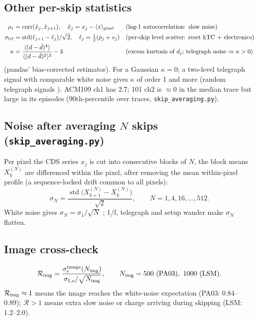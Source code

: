 \documentclass[10pt,a4paper]{article}
\newcommand{\code}[1]{\texttt{\small #1}}
\newcommand{\std}{\operatorname{std}}
\begin{document}
\subsection{Other per-skip statistics}
\begin{align}
\rho_1 &= \operatorname{corr}(\tilde x_j,\tilde x_{j+1}),\quad \tilde x_j = x_j-\langle x\rangle_{\text{pixel}}
&&\text{(lag-1 autocorrelation: slow noise)}\\
\sigma_{\rm lvl} &= \std(\ell_{j+1}-\ell_j)/\sqrt2,\quad \ell_j=\tfrac12(p_j+s_j)
&&\text{(per-skip level scatter: reset kTC + electronics)}\\
\kappa &= \frac{\langle (d-\bar d)^4\rangle}{\langle (d-\bar d)^2\rangle^2}-3
&&\text{(excess kurtosis of } d_j\text{; telegraph noise} \Rightarrow \kappa>0)
\end{align}
(pandas' bias-corrected estimator). For a Gaussian $\kappa=0$; a two-level telegraph signal with comparable white noise
gives $\kappa$ of order 1 and more (random telegraph signals \cite{kirton1989}). ACM109 ch1 has 2.7; 101 ch2 is $\approx0$ in the median trace but large in its
episodes (90th-percentile over traces, \code{skip\_averaging.py}).

\subsection{Noise after averaging $N$ skips (\code{skip\_averaging.py})}
Per pixel the CDS series $x_j$ is cut into consecutive blocks of $N$, the block means $X_k^{(N)}$ are differenced
within the pixel, after removing the mean within-pixel profile (a sequence-locked drift common to all pixels):
\begin{equation}
\sigma_N=\frac{\std\big(X^{(N)}_{k+1}-X^{(N)}_k\big)}{\sqrt2}, \qquad N=1,4,16,\dots,512.
\end{equation}
White noise gives $\sigma_N=\sigma_1/\sqrt N$ \cite{tiffenberg2017}; 1/f, telegraph and setup wander make $\sigma_N$ flatten.

\subsection{Image cross-check}
\begin{equation}
\mathcal R_{\rm img}=\frac{\sigma_e^{\rm image}(N_{\rm img})}{\sigma_{1,e}/\sqrt{N_{\rm img}}},
\qquad N_{\rm img}=500\ (\text{PA03}),\ 1000\ (\text{LSM}).
\end{equation}
$\mathcal R_{\rm img}\approx1$ means the image reaches the white-noise expectation (PA03: 0.84--0.89);
$\mathcal R>1$ means extra slow noise or charge arriving during skipping (LSM: 1.2--2.0).
\end{document}
